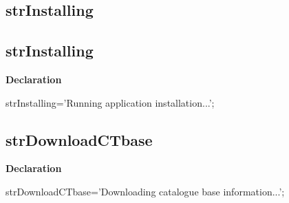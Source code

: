 \documentclass{report}
\newif\ifpdf
\begin{document}
\subsection*{\large{\textbf{strInstalling}}\normalsize\hspace{1ex}\hrulefill}
\else
\subsection*{strInstalling}
\fi
\label{trstrings-strInstalling}
\begin{list}{}{
\setlength{\itemindent}{0cm}
\setlength{\listparindent}{0cm}
\setlength{\leftmargin}{\evensidemargin}
\addtolength{\leftmargin}{\tmplength}
\settowidth{\labelsep}{X}
\addtolength{\leftmargin}{\labelsep}
\setlength{\labelwidth}{\tmplength}
}
\item[\textbf{Declaration}\hfill]
\ifpdf
\begin{flushleft}
\fi
\begin{ttfamily}
strInstalling='Running application installation...';\end{ttfamily}

\ifpdf
\end{flushleft}
\fi

\end{list}
\ifpdf
\subsection*{\large{\textbf{strDownloadCTbase}}\normalsize\hspace{1ex}\hrulefill}
\else
\subsection*{strDownloadCTbase}
\fi
\label{trstrings-strDownloadCTbase}
\begin{list}{}{
\setlength{\itemindent}{0cm}
\setlength{\listparindent}{0cm}
\setlength{\leftmargin}{\evensidemargin}
\addtolength{\leftmargin}{\tmplength}
\settowidth{\labelsep}{X}
\addtolength{\leftmargin}{\labelsep}
\setlength{\labelwidth}{\tmplength}
}
\item[\textbf{Declaration}\hfill]
\ifpdf
\begin{flushleft}
\fi
\begin{ttfamily}
strDownloadCTbase='Downloading catalogue base information...';\end{ttfamily}

\ifpdf
\end{flushleft}
\fi

\end{list}
\ifpdf
\end{document}
